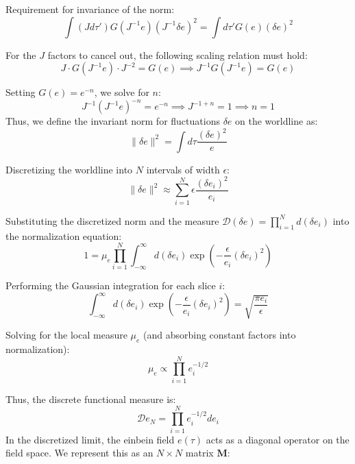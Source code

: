 \begin{tcolorbox}[breakable]
	Requirement for invariance of the norm:
	\begin{equation}
		\int (J d\tau') G(J^{-1} e) (J^{-1} \delta e)^2 = \int d\tau' G(e) (\delta e)^2
	\end{equation}
	
	For the $J$ factors to cancel out, the following scaling relation must hold:
	\begin{equation}
		J \cdot G(J^{-1} e) \cdot J^{-2} = G(e) \implies J^{-1} G(J^{-1} e) = G(e)
	\end{equation}
	
	Setting $G(e) = e^{-n}$, we solve for $n$:
	\begin{equation}
		J^{-1} (J^{-1} e)^{-n} = e^{-n} \implies J^{-1+n} = 1 \implies n = 1
	\end{equation}
	Thus, we define the invariant norm for fluctuations $\delta e$ on the worldline as:
	\begin{equation}
		\|\delta e\|^2 = \int d\tau \frac{(\delta e)^2}{e}
	\end{equation}
	
	Discretizing the worldline into $N$ intervals of width $\epsilon$:
	\begin{equation}
		\|\delta e\|^2 \approx \sum_{i=1}^N \epsilon \frac{(\delta e_i)^2}{e_i}
	\end{equation}
	
	Substituting the discretized norm and the measure $\mathcal{D}(\delta e) = \prod_{i=1}^N d(\delta e_i)$ into the normalization equation:
	\begin{equation}
		1 = \mu_e \prod_{i=1}^N \int_{-\infty}^{\infty} d(\delta e_i) \exp\left( - \frac{\epsilon}{e_i} (\delta e_i)^2 \right)
	\end{equation}
	
	Performing the Gaussian integration for each slice $i$:
	\begin{equation}
		\int_{-\infty}^{\infty} d(\delta e_i) \exp\left( - \frac{\epsilon}{e_i} (\delta e_i)^2 \right) = \sqrt{\frac{\pi e_i}{\epsilon}}
	\end{equation}
	
	Solving for the local measure $\mu_e$ (and absorbing constant factors into normalization):
	\begin{equation}
		\mu_e \propto \prod_{i=1}^N e_i^{-1/2}
	\end{equation}
	
	Thus, the discrete functional measure is:
	\begin{equation}
		\mathcal{D}e_N = \prod_{i=1}^N e_i^{-1/2} de_i
	\end{equation}	
	In the discretized limit, the einbein field $e(\tau)$ acts as a diagonal operator on the field space. We represent this as an $N \times N$ matrix $\mathbf{M}$:
	

\end{tcolorbox}
